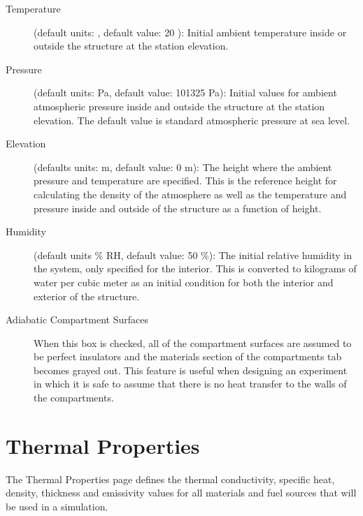\begin{description}
\item[Temperature] (default units: \degc, default value: 20 \degc): Initial ambient temperature inside or outside the structure at the station elevation.

\item[Pressure] (default units: Pa, default value: 101325 Pa): Initial values for ambient atmospheric pressure inside and outside the structure at the station elevation. The default value is standard atmospheric pressure at sea level.

\item[Elevation] (defaults units: m, default value: 0 m): The height where the ambient pressure and temperature are specified.  This is the reference height for calculating the density of the atmosphere as well as the temperature and pressure inside and outside of the structure as a function of height.

\item[Humidity] (default units \% RH, default value: 50 \%): The initial relative humidity in the system, only specified for the interior.  This is converted to kilograms of water per cubic meter as an initial condition for both the interior and exterior of the structure.

\item[Adiabatic Compartment Surfaces] When this box is checked, all of the compartment surfaces are assumed to be perfect insulators and the materials section of the compartments tab becomes grayed out. This feature is useful when designing an experiment in which it is safe to assume that there is no heat transfer to the walls of the compartments.
\end{description}

\chapter{Thermal Properties}
The Thermal Properties page defines the thermal conductivity, specific heat, density, thickness and emissivity values for all materials and fuel sources that will be used in a simulation.

